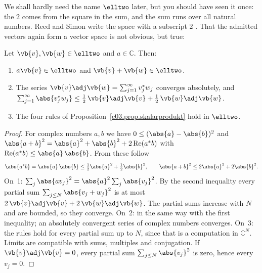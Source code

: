 \begin{vertiefung}

  We shall hardly need the name $\elltwo$ later, but you should have seen it once: the $2$
  comes from the square in the sum, and the sum runs over all natural numbers. Reed and Simon
  write the space with a subscript $2$ . That the admitted
  vectors again form a vector space is not obvious, but true:

  \begin{proposition}\label{c03.prop.elltwo}
    Let $\vb{v}, \vb{w} \in \elltwo$ and $a \in \mathbb{C}$. Then:
    \begin{enumerate}
      \item $a\vb{v} \in \elltwo$ and $\vb{v} + \vb{w} \in \elltwo$.
      \item The series $\vb{v}\adj\vb{w} = \sum_{j=1}^{\infty} v_j^* w_j$ converges absolutely,
        and $\sum_{j=1}^{\infty} \abs{v_j^* w_j} \leq \tfrac12\, \vb{v}\adj\vb{v} + \tfrac12\, \vb{w}\adj\vb{w}$.
      \item The four rules of Proposition~\ref{c03.prop.skalarprodukt} hold in $\elltwo$.
    \end{enumerate}
  \end{proposition}
  \begin{proof}
    For complex numbers $a, b$ we have $0 \leq (\abs{a} - \abs{b})^2$ and
    $\abs{a + b}^2 = \abs{a}^2 + \abs{b}^2 + 2 \operatorname{Re}(a^* b)$ with
    $\operatorname{Re}(a^* b) \leq \abs{a}\,\abs{b}$. From these follow
    \begin{equation}\label{c03.eq.ab}
      \abs{a^* b} = \abs{a}\,\abs{b} \leq \tfrac12 \abs{a}^2 + \tfrac12 \abs{b}^2,
      \qquad
      \abs{a + b}^2 \leq 2\abs{a}^2 + 2\abs{b}^2 .
    \end{equation}
    On~1: $\sum_{j} \abs{a v_j}^2 = \abs{a}^2 \sum_j \abs{v_j}^2$. By the second inequality
    every partial sum $\sum_{j \leq N} \abs{v_j + w_j}^2$ is at most
    $2\, \vb{v}\adj\vb{v} + 2\, \vb{w}\adj\vb{w}$. The partial sums increase with $N$ and are
    bounded, so they converge. On~2: in the same way with the first inequality; an absolutely
    convergent series of complex numbers converges. On~3: the rules hold for every partial
    sum up to $N$, since that is a computation in $\mathbb{C}^N$. Limits are compatible with
    sums, multiples and conjugation. If $\vb{v}\adj\vb{v} = 0$, every partial sum
    $\sum_{j \leq N} \abs{v_j}^2$ is zero, hence every $v_j = 0$.
  \end{proof}


\end{vertiefung}
